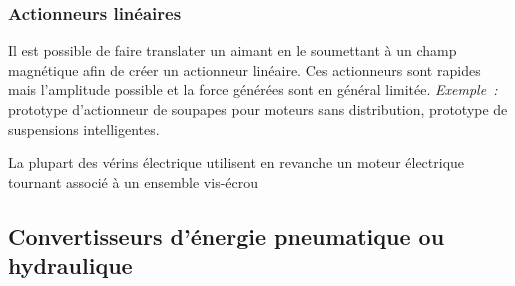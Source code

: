 \hypertarget{actionneurs-linuxe9aires}{%
\subsubsection{Actionneurs linéaires}\label{actionneurs-linuxe9aires}}

Il est possible de faire translater un aimant en le soumettant à un
champ magnétique afin de créer un actionneur linéaire. Ces actionneurs
sont rapides mais l'amplitude possible et la force générées sont en
général limitée. \emph{Exemple~:} prototype d'actionneur de soupapes
pour moteurs sans distribution, prototype de suspensions intelligentes.

La plupart des vérins électrique utilisent en revanche un moteur
électrique tournant associé à un ensemble vis-écrou

\hypertarget{convertisseurs-duxe9nergie-pneumatique-ou-hydraulique}{%
\subsection{Convertisseurs d'énergie pneumatique ou
hydraulique}\label{convertisseurs-duxe9nergie-pneumatique-ou-hydraulique}}

